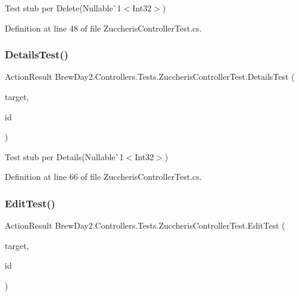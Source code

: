 Test stub per Delete(Nullable\`{}1$<$Int32$>$)



Definition at line 48 of file Zuccheris\+Controller\+Test.\+cs.

\mbox{\label{class_brew_day2_1_1_controllers_1_1_tests_1_1_zuccheris_controller_test_af96de6a10f462777aa3791e5268b2084}} 
\subsubsection{\texorpdfstring{Details\+Test()}{DetailsTest()}}
{\footnotesize\ttfamily Action\+Result Brew\+Day2.\+Controllers.\+Tests.\+Zuccheris\+Controller\+Test.\+Details\+Test (\begin{DoxyParamCaption}\item[{\mbox{[}\+Pex\+Assume\+Under\+Test\mbox{]} \mbox{\hyperlink{class_brew_day2_1_1_controllers_1_1_zuccheris_controller}{Zuccheris\+Controller}}}]{target,  }\item[{int?}]{id }\end{DoxyParamCaption})}



Test stub per Details(Nullable\`{}1$<$Int32$>$)



Definition at line 66 of file Zuccheris\+Controller\+Test.\+cs.

\mbox{\label{class_brew_day2_1_1_controllers_1_1_tests_1_1_zuccheris_controller_test_a06808d5f0730d8f1336650afd6627f08}} 
\subsubsection{\texorpdfstring{Edit\+Test()}{EditTest()}}
{\footnotesize\ttfamily Action\+Result Brew\+Day2.\+Controllers.\+Tests.\+Zuccheris\+Controller\+Test.\+Edit\+Test (\begin{DoxyParamCaption}\item[{\mbox{[}\+Pex\+Assume\+Under\+Test\mbox{]} \mbox{\hyperlink{class_brew_day2_1_1_controllers_1_1_zuccheris_controller}{Zuccheris\+Controller}}}]{target,  }\item[{int?}]{id }\end{DoxyParamCaption})}



